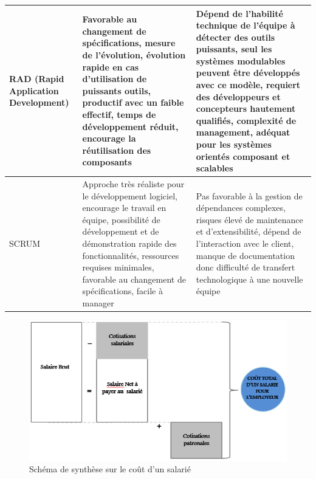 \begin{center}
\begin{longtable}{|p{}|p{}|p{}|}
		\hline
		RAD (Rapid Application Development) &  
		Favorable au changement de spécifications, mesure de l’évolution, évolution rapide en cas d’utilisation de puissants outils, productif avec un faible effectif, temps de développement réduit, encourage la réutilisation des composants &
		Dépend de l’habilité technique de l’équipe à détecter des outils puissants, seul les systèmes modulables peuvent être développés avec ce modèle, requiert des développeurs et concepteurs hautement qualifiés, complexité de management, adéquat pour les systèmes orientés composant et scalables
		\\
		
		\hline
		SCRUM &  
		Approche très réaliste pour le développement logiciel, encourage le travail en équipe, possibilité de développement et de démonstration rapide des fonctionnalités, ressources requises minimales, favorable au changement de spécifications, facile à manager &
		Pas favorable à la gestion de dépendances complexes, risques élevé de maintenance et d’extensibilité, dépend de l’interaction avec le client, manque de documentation donc difficulté de transfert  technologique  à  une nouvelle équipe
		\\
		
		\hline 
	\end{longtable} 
\end{center}




\begin{figure}[h]
	\begin{center}
		\includegraphics[scale=0.85]{images/remuneration.png}
		\caption{Schéma de synthèse sur le coût d'un salarié}
		\label{synthese-cout-salarie}
	\end{center}
\end{figure}















